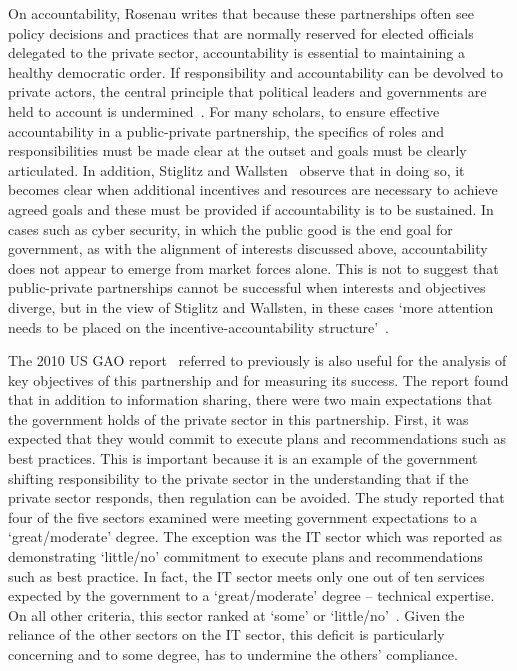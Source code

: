 \documentclass[a4paper,11pt]{article}
\begin{document}
On accountability, Rosenau writes that because these partnerships
often see policy decisions and practices that are normally reserved
for elected officials delegated to the private sector, accountability
is essential to maintaining a healthy democratic order. If
responsibility and accountability can be devolved to private actors,
the central principle that political leaders and governments are held
to account is undermined~\cite{rosenau:1999}.  For many scholars, to
ensure effective accountability in a public-private partnership, the
specifics of roles and responsibilities must be made clear at the
outset and goals must be clearly articulated.  In addition, Stiglitz
and Wallsten~\cite{stiglitz+wallsten:1999} observe that in doing so,
it becomes clear when additional incentives and resources are
necessary to achieve agreed goals and these must be provided if
accountability is to be sustained.  In cases such as cyber security,
in which the public good is the end goal for government, as with the
alignment of interests discussed above, accountability does not appear
to emerge from market forces alone.  This is not to suggest that
public-private partnerships cannot be successful when interests and
objectives diverge, but in the view of Stiglitz and Wallsten, in these
cases `more attention needs to be placed on the
incentive-accountability structure'~\cite{stiglitz+wallsten:1999}.

The 2010 US GAO report~\cite{usgao:2010} referred to previously is
also useful for the analysis of key objectives of this partnership and
for measuring its success.  The report found that in addition to
information sharing, there were two main expectations that the
government holds of the private sector in this partnership. First, it
was expected that they would commit to execute plans and
recommendations such as best practices. This is important because it
is an example of the government shifting responsibility to the private
sector in the understanding that if the private sector responds, then
regulation can be avoided. The study reported that four of the five
sectors examined were meeting government expectations to a
`great/moderate' degree. The exception was the IT sector which was
reported as demonstrating ‘little/no’ commitment to execute plans and
recommendations such as best practice.  In fact, the IT sector meets
only one out of ten services expected by the government to a
`great/moderate' degree – technical expertise. On all other criteria,
this sector ranked at `some' or `little/no'~\cite{usgao:2010}. Given
the reliance of the other sectors on the IT sector, this deficit is
particularly concerning and to some degree, has to undermine the
others' compliance.
\end{document}
